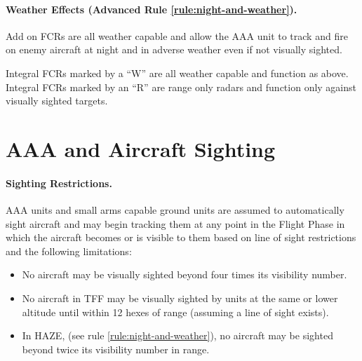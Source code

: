 \paragraph{Weather Effects (Advanced Rule \ref{rule:night-and-weather}).} Add on FCRs are all weather capable and allow the AAA unit to track and fire on enemy aircraft at night and in adverse weather even if not visually sighted.

Integral FCRs marked by a “W” are all weather capable and function as above. Integral FCRs marked by an “R” are range only radars and function only against visually sighted targets.

\section{AAA and Aircraft Sighting}

\paragraph{Sighting Restrictions.} AAA units and small arms capable ground units are assumed to automatically sight aircraft and may begin tracking them at any point in the Flight Phase in which the aircraft becomes or is visible to them based on line of sight restrictions and the following limitations:

\begin{itemize}

    \item No aircraft may be visually sighted beyond four times its visibility number.

    \item No aircraft in TFF may be visually sighted by units at the same or lower altitude until within 12 hexes of range (assuming a line of sight exists).

    \item In HAZE, (see rule \ref{rule:night-and-weather}), no aircraft may be sighted beyond twice its visibility number in range.
    

\end{itemize}



